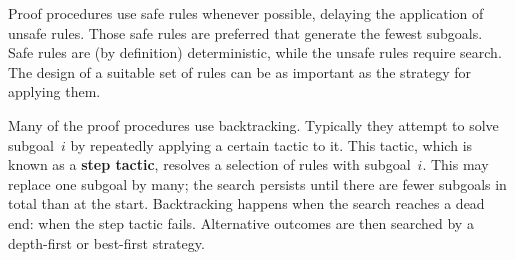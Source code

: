 Proof procedures use safe rules whenever possible, delaying the application
of unsafe rules. Those safe rules are preferred that generate the fewest
subgoals. Safe rules are (by definition) deterministic, while the unsafe
rules require search. The design of a suitable set of rules can be as
important as the strategy for applying them.

Many of the proof procedures use backtracking.  Typically they attempt to
solve subgoal~$i$ by repeatedly applying a certain tactic to it.  This
tactic, which is known as a {\bf step tactic}, resolves a selection of
rules with subgoal~$i$. This may replace one subgoal by many;  the
search persists until there are fewer subgoals in total than at the start.
Backtracking happens when the search reaches a dead end: when the step
tactic fails.  Alternative outcomes are then searched by a depth-first or
best-first strategy.  
